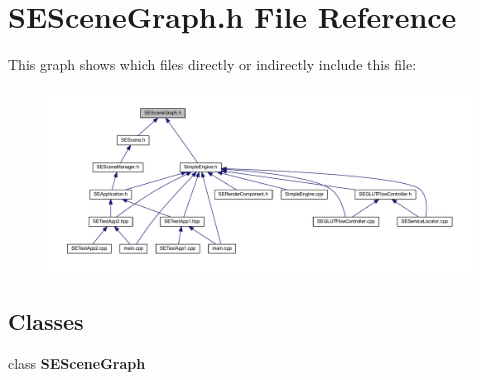 \section{S\+E\+Scene\+Graph.\+h File Reference}
\label{_s_e_scene_graph_8h}
This graph shows which files directly or indirectly include this file\+:
\nopagebreak
\begin{figure}[H]
\begin{center}
\leavevmode
\includegraphics[width=350pt]{_s_e_scene_graph_8h__dep__incl}
\end{center}
\end{figure}
\subsection*{Classes}
\begin{DoxyCompactItemize}
\item 
class {\bf S\+E\+Scene\+Graph}
\end{DoxyCompactItemize}
